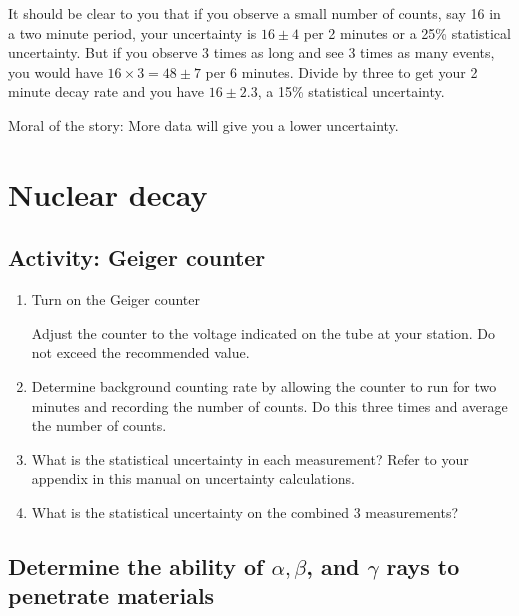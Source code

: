 It should be clear to you that if you observe a small number of counts, say 16 in a two minute period, your uncertainty is $16\pm4$ per 2 minutes or a 25\% statistical uncertainty.  But if you observe 3 times as long and see 3 times as many events, you would have $16\times3=48\pm7$ per 6 minutes.  Divide by three to get your 2 minute decay rate and you have $16\pm2.3$, a 15\% statistical uncertainty.

Moral of the story:  More data will give you a lower uncertainty.

\section {Nuclear decay}

\subsection{Activity: Geiger counter}
\begin{enumerate}
	 \item Turn on the Geiger counter

Adjust the counter to the voltage indicated on the tube at your station. Do not exceed the recommended value.

	\item Determine background counting rate by allowing the counter to run for two minutes and recording the number of counts. Do this three times and average the number of counts.
	\item What is the statistical uncertainty in each measurement?  Refer to your appendix in this manual on uncertainty calculations.
	\item What is the statistical uncertainty on the combined 3 measurements?
\end{enumerate}

\subsection{Determine the ability of  $\alpha, \beta$, and $\gamma $ rays to penetrate materials}

